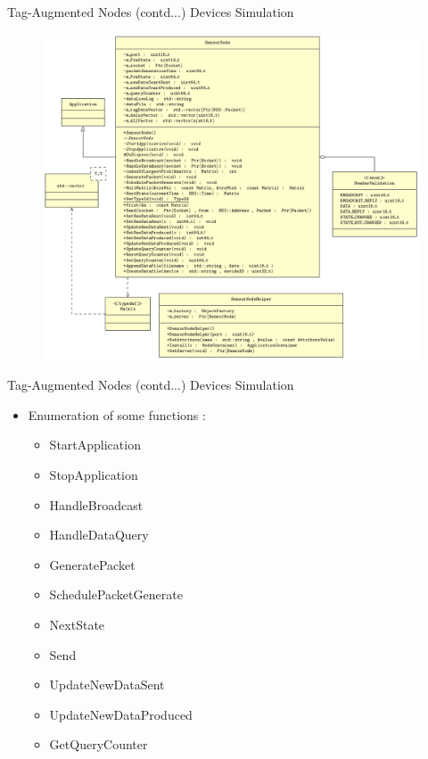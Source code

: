 \documentclass [xcolor=svgnames, t] {beamer}
\begin{document}
\begin{frame}{Tag-Augmented Nodes (contd...)}
    Devices Simulation\\
    \begin{figure}
        \includegraphics[width=.75\textwidth,height=.75\textheight]{sensory-node-class-diagram}
        \label{fig_nodeUML}
    \end{figure}

\end{frame}


\begin{frame}{Tag-Augmented Nodes (contd...)}
    Devices Simulation\\
    \vspace{.5cm}
    \begin{itemize}
        \item Enumeration of some functions :
            \begin{itemize}
                \item StartApplication
                \item StopApplication
                \item HandleBroadcast
                \item HandleDataQuery
                \item GeneratePacket
                \item SchedulePacketGenerate
                \item NextState
                \item Send
                \item UpdateNewDataSent
                \item UpdateNewDataProduced
                \item GetQueryCounter
            \end{itemize}
    \end{itemize}
       
\end{frame}
\end{document}
